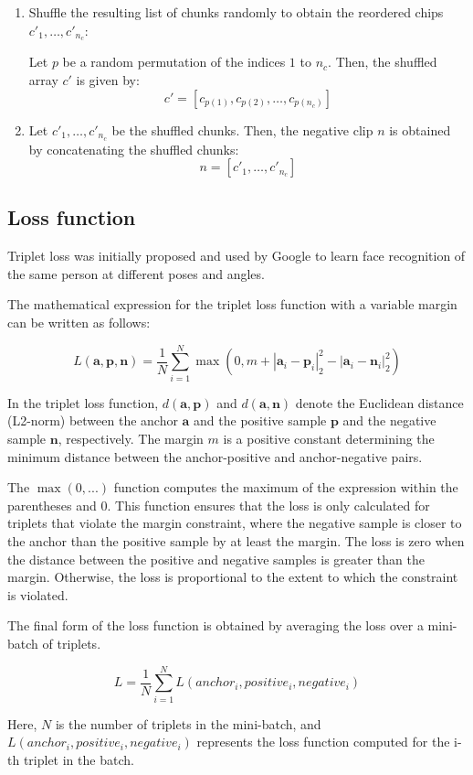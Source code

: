 \begin{enumerate}
\item Shuffle the resulting list of chunks randomly to obtain the reordered chips $c'_1,\ldots,c'_{n_c}$:

Let $p$ be a random permutation of the indices $1$ to $n_c$. Then, the shuffled array $c'$ is given by:
\begin{equation}
c' = [c_{p(1)}, c_{p(2)}, \dots, c_{p(n_c)}]
\end{equation}


\item Let $c'_1, \dots, c'_{n_c}$ be the shuffled chunks. Then, the negative clip $n$ is obtained by concatenating the shuffled chunks:
\begin{equation}
n = [c'_1, \dots, c'_{n_c}]
\end{equation}


\end{enumerate}

\subsection{Loss function}

Triplet loss was initially proposed and used by Google to learn face recognition of the same person at different poses and angles. \cite{Schroff2015FaceNet:Clustering}

The mathematical expression for the triplet loss function with a variable margin can be written as follows:

\begin{equation}
L(\mathbf{a}, \mathbf{p}, \mathbf{n}) = \frac{1}{N} \sum_{i=1}^{N} \max \left(0, m + \left| \mathbf{a}_i - \mathbf{p}_i \right|_2^2 - \left| \mathbf{a}_i - \mathbf{n}_i \right|_2^2 \right)
\end{equation}

In the triplet loss function, $d(\mathbf{a}, \mathbf{p})$ and $d(\mathbf{a}, \mathbf{n})$ denote the Euclidean distance (L2-norm) between the anchor $\mathbf{a}$ and the positive sample $\mathbf{p}$ and the negative sample $\mathbf{n}$, respectively. The margin $m$ is a positive constant determining the minimum distance between the anchor-positive and anchor-negative pairs.

The $\max(0, ...)$ function computes the maximum of the expression within the parentheses and 0. This function ensures that the loss is only calculated for triplets that violate the margin constraint, where the negative sample is closer to the anchor than the positive sample by at least the margin. The loss is zero when the distance between the positive and negative samples is greater than the margin. Otherwise, the loss is proportional to the extent to which the constraint is violated.

The final form of the loss function is obtained by averaging the loss over a mini-batch of triplets. 

\begin{equation}
L = \frac{1}{N} \sum_{i=1}^{N} L(anchor_i, positive_i, negative_i)
\end{equation}

Here, $N$ is the number of triplets in the mini-batch, and $L(anchor_i, positive_i, negative_i)$ represents the loss function computed for the i-th triplet in the batch.